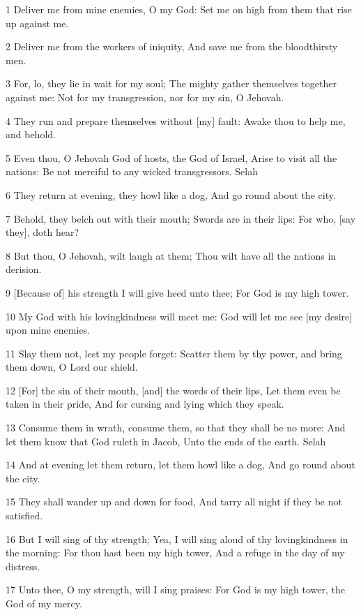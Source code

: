 \par 1 Deliver me from mine enemies, O my God: Set me on high from them that rise up against me.
\par 2 Deliver me from the workers of iniquity, And save me from the bloodthirsty men.
\par 3 For, lo, they lie in wait for my soul; The mighty gather themselves together against me: Not for my transgression, nor for my sin, O Jehovah.
\par 4 They run and prepare themselves without [my] fault: Awake thou to help me, and behold.
\par 5 Even thou, O Jehovah God of hosts, the God of Israel, Arise to visit all the nations: Be not merciful to any wicked transgressors. Selah
\par 6 They return at evening, they howl like a dog, And go round about the city.
\par 7 Behold, they belch out with their mouth; Swords are in their lips: For who, [say they], doth hear?
\par 8 But thou, O Jehovah, wilt laugh at them; Thou wilt have all the nations in derision.
\par 9 [Because of] his strength I will give heed unto thee; For God is my high tower.
\par 10 My God with his lovingkindness will meet me: God will let me see [my desire] upon mine enemies.
\par 11 Slay them not, lest my people forget: Scatter them by thy power, and bring them down, O Lord our shield.
\par 12 [For] the sin of their mouth, [and] the words of their lips, Let them even be taken in their pride, And for cursing and lying which they speak.
\par 13 Consume them in wrath, consume them, so that they shall be no more: And let them know that God ruleth in Jacob, Unto the ends of the earth. Selah
\par 14 And at evening let them return, let them howl like a dog, And go round about the city.
\par 15 They shall wander up and down for food, And tarry all night if they be not satisfied.
\par 16 But I will sing of thy strength; Yea, I will sing aloud of thy lovingkindness in the morning: For thou hast been my high tower, And a refuge in the day of my distress.
\par 17 Unto thee, O my strength, will I sing praises: For God is my high tower, the God of my mercy.

